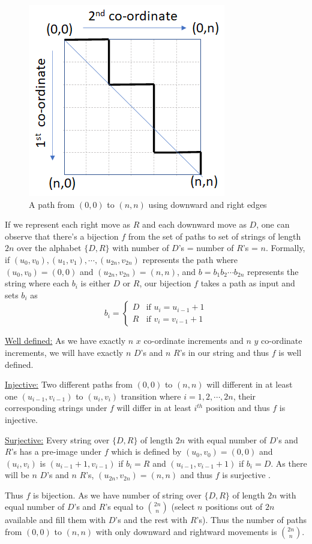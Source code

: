 \begin{figure}[h!]
    \centering
    \includegraphics[width=0.4\linewidth]{images/sample-path.png}
    \caption{A path from $(0,0)$ to $(n,n)$ using downward and right edges}
    \label{fig:sample-path}
\end{figure}

If we represent each right move as $R$ and each downward move as $D$, one can observe that there's a bijection $f$ from the set of paths to set of strings of length $2n$ over the alphabet $\{D,R\}$ with number of $D$'s = number of $R$'s = $n$. Formally, if $(u_0,v_0), (u_1,v_1),\cdots,(u_{2n},v_{2n})$ represents the path where $(u_0,v_0)=(0,0)$ and $(u_{2n},v_{2n})=(n,n)$, and $b=b_1b_2\cdots b_{2n}$ represents the string where each $b_i$ is either $D$ or $R$, our bijection $f$ takes a path as input and sets $b_i$ as
$$b_i=\begin{cases}
D &\mbox{if } u_i = u_{i-1}+1\\
R &\mbox{if } v_i = v_{i-1}+1
\end{cases}$$
\begin{description}
\item \underline{Well defined:} As we have exactly $n$ $x$ co-ordinate increments and $n$ $y$ co-ordinate increments, we will have exactly $n$ $D$'s and $n$ $R$'s in our string and thus $f$ is well defined.
\item \underline{Injective:} Two different paths from $(0,0)$ to $(n,n)$ will different in at least one $(u_{i-1},v_{i-1})$ to $(u_i,v_i)$ transition where $i=1,2,\cdots,2n$, their corresponding strings under $f$ will differ in at least $i^{th}$ position and thus $f$ is injective.
\item \underline{Surjective:} Every string over $\{D,R\}$ of length $2n$ with equal number of $D$'s and $R$'s has a pre-image under $f$ which is defined by $(u_0,v_0)=(0,0)$ and $(u_i,v_i)$ is $(u_{i-1}+1,v_{i-1})$ if $b_i=R$ and $(u_{i-1},v_{i-1}+1)$ if $b_i=D$. As there will be $n$ $D$'s and $n$ $R$'s, $(u_{2n},v_{2n})=(n,n)$ and thus $f$ is surjective .
\end{description} 
Thus $f$ is bijection. As we have number of string over $\{D,R\}$ of length $2n$ with equal number of $D$'s and $R$'s equal to $\binom{2n}{n}$ (select $n$ positions out of $2n$ available and fill them with $D$'s and the rest with $R$'s). Thus the number of paths from $(0,0)$ to $(n,n)$ with only downward and rightward movements is $\binom{2n}{n}$.

